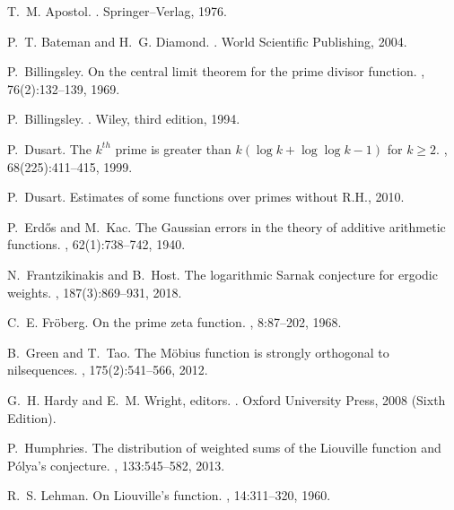 \documentclass[11pt,reqno,a4letter]{article}
\numberwithin{equation}{section}
\numberwithin{figure}{section}
\numberwithin{table}{section}
\theoremstyle{plain}
\numberwithin{theorem}{section}
\theoremstyle{definition}
\begin{document}
\begin{thebibliography}{10}

T.~M. Apostol.
.
\newblock Springer--Verlag, 1976.

P.~T. Bateman and H.~G. Diamond.
.
\newblock World Scientific Publishing, 2004.

P.~Billingsley.
\newblock On the central limit theorem for the prime divisor function.
, 76(2):132--139, 1969.

P.~Billingsley.
.
\newblock Wiley, third edition, 1994.

P.~Dusart.
\newblock The $k^{th}$ prime is greater than $k(\log k +\log\log k-1)$ for $k
  \geq 2$.
, 68(225):411--415, 1999.

P.~Dusart.
\newblock Estimates of some functions over primes without {R}.{H}., 2010.

P.~Erd{\H{o}}s and M.~Kac.
\newblock The {G}aussian errors in the theory of additive arithmetic functions.
, 62(1):738--742, 1940.

N.~Frantzikinakis and B.~Host.
\newblock The logarithmic {S}arnak conjecture for ergodic weights.
, 187(3):869--931, 2018.

C.~E. Fr{\"{o}}berg.
\newblock On the prime zeta function.
, 8:87--202, 1968.

B.~Green and T.~Tao.
\newblock The {M}\"{o}bius function is strongly orthogonal to nilsequences.
, 175(2):541--566, 2012.

G.~H. Hardy and E.~M. Wright, editors.
.
\newblock Oxford University Press, 2008 (Sixth Edition).

P.~Humphries.
\newblock The distribution of weighted sums of the {L}iouville function and
  {P}\'{o}lya's conjecture.
, 133:545--582, 2013.

R.~S. Lehman.
\newblock On {L}iouville's function.
, 14:311--320, 1960.


\end{thebibliography}
\end{document}

